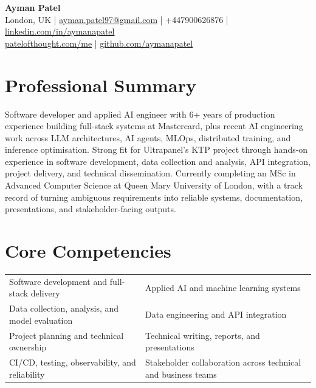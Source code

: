 \documentclass[a4paper,10pt]{article}
\begin{document}
\begin{center}
  {\LARGE \textbf{Ayman Patel}}\\
  \vspace{2pt}
  London, UK \quad | \quad
  \href{mailto:ayman.patel97@gmail.com}{ayman.patel97@gmail.com} \quad | \quad
  +447900626876 \quad | \quad
  \href{https://linkedin.com/in/aymanapatel}{linkedin.com/in/aymanapatel}\\
  \href{https://patelofthought.com/me}{patelofthought.com/me} \quad | \quad
  \href{https://github.com/aymanapatel}{github.com/aymanapatel}
\end{center}

\section{Professional Summary}
{\small
Software developer and applied AI engineer with 6+ years of production experience building full-stack systems at Mastercard, plus recent AI engineering work across LLM architectures, AI agents, MLOps, distributed training, and inference optimisation. Strong fit for Ultrapanel's KTP project through hands-on experience in software development, data collection and analysis, API integration, project delivery, and technical dissemination. Currently completing an MSc in Advanced Computer Science at Queen Mary University of London, with a track record of turning ambiguous requirements into reliable systems, documentation, presentations, and stakeholder-facing outputs.
}

\section{Core Competencies}
\begin{tabularx}{\textwidth}{@{}X X@{}}
{\small Software development and full-stack delivery} & {\small Applied AI and machine learning systems} \\
{\small Data collection, analysis, and model evaluation} & {\small Data engineering and API integration} \\
{\small Project planning and technical ownership} & {\small Technical writing, reports, and presentations} \\
{\small CI/CD, testing, observability, and reliability} & {\small Stakeholder collaboration across technical and business teams}
\end{tabularx}
\end{document}
